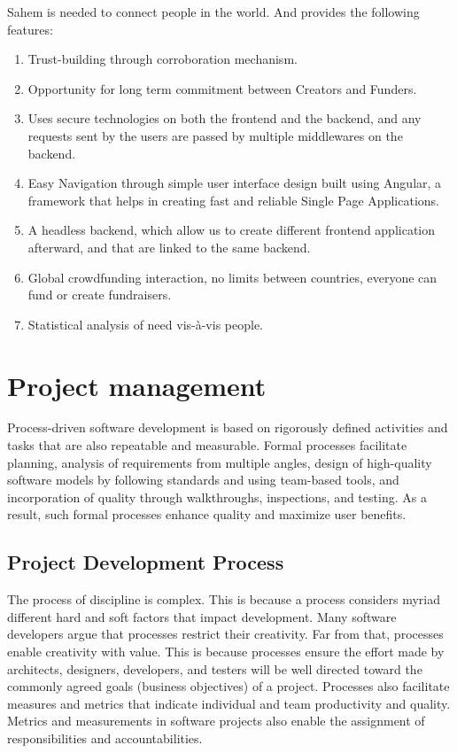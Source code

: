 Sahem is needed to connect people in the world. And provides the following features:
\begin{enumerate}
      \item
            Trust-building through corroboration mechanism.
      \item
            Opportunity for long term commitment between Creators and Funders.
      \item
            Uses secure technologies on both the frontend and the backend, and any requests sent by the users are passed by multiple middlewares on the backend.
      \item
            Easy Navigation through simple user interface design built using Angular, a framework that helps in creating fast and reliable Single Page Applications.
      \item
            A headless backend, which allow us to create different frontend application afterward, and that are linked to the same backend.
      \item
            Global crowdfunding interaction, no limits between countries, everyone can fund or create fundraisers.
      \item
            Statistical analysis of need vis-à-vis people.
\end{enumerate}
\section{ Project management }
Process-driven software development is based on rigorously defined activities and tasks that are also repeatable and measurable. Formal processes facilitate planning, analysis of requirements from multiple angles, design of high-quality software models by following standards and using team-based tools, and incorporation of quality through walkthroughs, inspections, and testing.
As a result, such formal processes enhance quality and maximize user benefits.
\subsection{ Project Development Process }
The process of discipline is complex. This is because a process considers myriad different hard and soft factors that impact development. Many software developers argue that processes restrict their creativity. Far from that, processes enable creativity with value. This is because processes ensure the effort made by architects, designers, developers, and testers will be well directed toward the commonly agreed goals (business objectives) of a project. Processes also facilitate measures and metrics that indicate individual and team productivity and quality. Metrics and measurements in software projects also enable the assignment of responsibilities and accountabilities.
